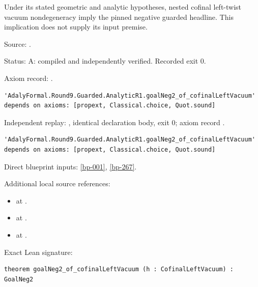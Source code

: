 \begin{theorem}[bp-268]
\label{bp-268}
\leanok
Under its stated geometric and analytic hypotheses, nested cofinal left-twist vacuum nondegeneracy imply the pinned negative guarded headline. This implication does not supply its input premise.

\par Source: \texttt{}.
\par Status: A: compiled and independently verified. Recorded exit 0.
\par Axiom record: \texttt{}.
\begin{verbatim}
'AdalyFormal.Round9.Guarded.AnalyticR1.goalNeg2_of_cofinalLeftVacuum' depends on axioms: [propext, Classical.choice, Quot.sound]
\end{verbatim}
\par Independent replay: \texttt{}, identical declaration body, exit 0; axiom record \texttt{}.
\begin{verbatim}
'AdalyFormal.Round9.Guarded.AnalyticR1.goalNeg2_of_cofinalLeftVacuum' depends on axioms: [propext, Classical.choice, Quot.sound]
\end{verbatim}
\par Direct blueprint inputs: \ref{bp-001}, \ref{bp-267}.
\par Additional local source references:
\begin{itemize}
\item \texttt{} at \texttt{}.
\item \texttt{} at \texttt{}.
\item \texttt{} at \texttt{}.
\end{itemize}
\par Exact Lean signature:
\begin{verbatim}
theorem goalNeg2_of_cofinalLeftVacuum (h : CofinalLeftVacuum) : GoalNeg2
\end{verbatim}
\end{theorem}

